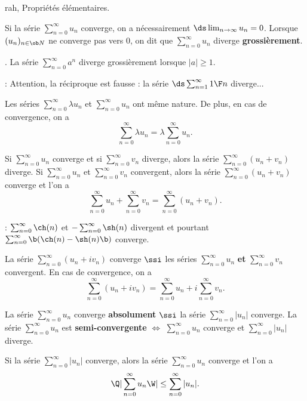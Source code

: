 \Subsection rah, Propri\'et\'es \'el\'ementaires.


Si la s\'erie $\sum_{n=0}^\infty u_n$ converge, on a n\'ecessairement $\ds\lim_{n\to\infty}u_n=0$. \medskip\noindent
Lorsque $(u_n)_{n\in\ob N}$ ne converge pas vers $0$, 
on dit que $\sum_{n=0}^\infty u_n$ diverge {\bf grossi\`erement}. 

\Exemple. La s\'erie $\sum_{n=0}^\infty a^n$ diverge grossi\`erement lorsque $|a|\ge1$. 
\bigskip

\Remarque : Attention, la r\'eciproque est fausse : la s\'erie $\ds\sum_{n=1}^\infty{1\F n}$ diverge... 
\bigskip



Les s\'eries $\sum_{n=0}^\infty \lambda u_n$ et $\sum_{n=0}^\infty u_n$ ont m\^eme nature. 
De plus, en cas de convergence, on a 
\Equation [\bf Multiplication]
$$
\sum_{n=0}^\infty\lambda u_n=\lambda\sum_{n=0}^\infty u_n. 
$$

Si $\sum_{n=0}^\infty u_n$ converge et si $\sum_{n=0}^\infty v_n$ diverge, 
alors la s\'erie $\sum_{n=0}^\infty(u_n+v_n)$ diverge. \medskip\noindent 
Si $\sum_{n=0}^\infty u_n$ et $\sum_{n=0}^\infty v_n$ convergent, 
alors la s\'erie $\sum_{n=0}^\infty(u_n+v_n)$ converge et l'on a 
\Equation[\bf Addition]
$$
\sum_{n=0}^\infty u_n+\sum_{n=0}^\infty v_n=\sum_{n=0}^\infty(u_n+v_n).
$$ 

\Remarque : $\sum_{n=0}^\infty\ch(n)$ et $-\sum_{n=0}^\infty\sh(n)$ divergent et pourtant $\sum_{n=0}^\infty\b(\ch (n)-\sh(n)\b)$ converge. 
\bigskip

La s\'erie $\sum_{n=0}^\infty(u_n+iv_n)$ converge $\ssi$ les s\'eries 
$\sum_{n=0}^\infty u_n$ {\bf et} $\sum_{n=0}^\infty v_n$ convergent. 
En cas de convergence, on a 
\Equation [\bf Composantes]
$$
\sum_{n=0}^\infty(u_n+i v_n)=\sum_{n=0}^\infty u_n+i\sum_{n=0}^\infty v_n. 
$$

La s\'erie $\sum_{n=0}^\infty u_n$ converge {\bf absolument} $\ssi$ 
la s\'erie $\sum_{n=0}^\infty|u_n|$ converge. \medskip\noindent
La s\'erie $\sum_{n=0}^\infty u_n$ est {\bf semi-convergente} $\Longleftrightarrow$ 
$\sum_{n=0}^\infty u_n$ converge et $\sum_{n=0}^\infty|u_n|$ diverge. 


Si la s\'erie $\sum_{n=0}^\infty|u_n|$ converge, alors la s\'erie $\sum_{n=0}^\infty u_n$ converge et l'on a 
$$
\Q|\sum_{n=0}^\infty u_n\W|\le \sum_{n=0}^\infty|u_n|. 
$$


